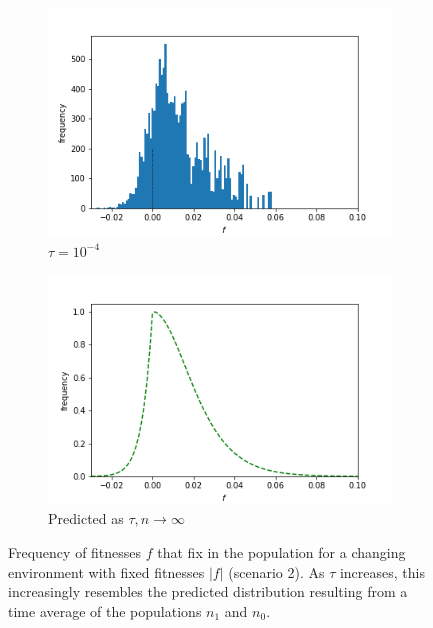 \documentclass{article}
\begin{document}
\begin{figure}[h]
\begin{subfigure}[t]{0.24\linewidth}
		\includegraphics[width = 1.0\linewidth, trim={5 5 40 30}, clip=true]{figures/tau5e3_selection_hist2.png}
		\caption{$\tau = 10^{-4}$}
		\label{fig:t4}
	\end{subfigure}
	\begin{subfigure}[t]{0.24\linewidth}
		\centering
		\includegraphics[width = 1.0\linewidth, trim={5 5 40 30}, clip=true]{figures/no_n_combined_dists.png}
		\caption{Predicted as $\tau, n \rightarrow \infty$}
		\label{fig:pred}
	\end{subfigure}
\caption{Frequency of fitnesses $f$ that fix in the population for a changing environment with fixed fitnesses $|f|$ (scenario 2). As $\tau$ increases, this increasingly resembles the predicted distribution resulting from a time average of the populations $n_1$ and $n_0$.}
\label{fig:changing_constant_taus}
\end{figure}
\end{document}
